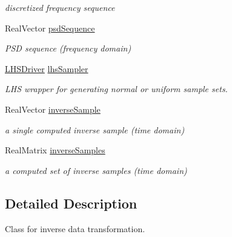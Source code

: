 \begin{DoxyCompactItemize}
\begin{DoxyCompactList}\small\item\em discretized frequency sequence \end{DoxyCompactList}\item 
Real\+Vector \hyperlink{classPecos_1_1InverseTransformation_a6581c2dbbad535c9fc176635dfbbf709}{psd\+Sequence}\label{classPecos_1_1InverseTransformation_a6581c2dbbad535c9fc176635dfbbf709}

\begin{DoxyCompactList}\small\item\em P\+SD sequence (frequency domain) \end{DoxyCompactList}\item 
\hyperlink{classPecos_1_1LHSDriver}{L\+H\+S\+Driver} \hyperlink{classPecos_1_1InverseTransformation_a00989baaeba2eacae4fb147c47d04f1f}{lhs\+Sampler}\label{classPecos_1_1InverseTransformation_a00989baaeba2eacae4fb147c47d04f1f}

\begin{DoxyCompactList}\small\item\em L\+HS wrapper for generating normal or uniform sample sets. \end{DoxyCompactList}\item 
Real\+Vector \hyperlink{classPecos_1_1InverseTransformation_a17018c54acd67607b74c8783997d43a9}{inverse\+Sample}\label{classPecos_1_1InverseTransformation_a17018c54acd67607b74c8783997d43a9}

\begin{DoxyCompactList}\small\item\em a single computed inverse sample (time domain) \end{DoxyCompactList}\item 
Real\+Matrix \hyperlink{classPecos_1_1InverseTransformation_ab9922b4f4d5024622225f70ea343f9ee}{inverse\+Samples}\label{classPecos_1_1InverseTransformation_ab9922b4f4d5024622225f70ea343f9ee}

\begin{DoxyCompactList}\small\item\em a computed set of inverse samples (time domain) \end{DoxyCompactList}\end{DoxyCompactItemize}


\subsection{Detailed Description}
Class for inverse data transformation. 

